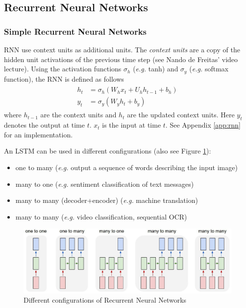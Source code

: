 \documentclass[a4paper,twoside,10pt]{article}
\begin{document}
\subsection{Recurrent Neural Networks}
\subsubsection{Simple Recurrent Neural Networks}
\ac{RNN} use context units as additional units.
The \emph{context units} are a copy of the hidden unit activations of the previous time step (see Nando de Freitas' video lecture\citep{defreitas12}).
Using the activation functions $\sigma_h$ (\emph{e.g.} tanh) and $\sigma_y$ (\emph{e.g.} softmax function), the \ac{RNN} is defined as follows\citep{wiki:rnn,elman_finding_1990,suresh}
\begin{align*}
  \begin{split}
    h_t&=\sigma_h(W_hx_t+U_hh_{t-1}+b_h)\\
    y_t&=\sigma_y(W_yh_t+b_y)
  \end{split}
\end{align*}
where $h_{t-1}$ are the context units and $h_t$ are the updated context units.
Here $y_t$ denotes the output at time $t$. $x_t$ is the input at time $t$.
See Appendix \ref{app:rnn} for an implementation.

An \ac{LSTM} can be used in different configurations\citep{karpathy2016cs231n} (also see Figure \ref{fig:rnnconf}):
\begin{itemize}
  \item one to many (\emph{e.g.} output a sequence of words describing the input image)
  \item many to one (\emph{e.g.} sentiment classification of text messages)
  \item many to many (decoder+encoder) (\emph{e.g.} machine translation)
  \item many to many (\emph{e.g.} video classification, sequential \ac{OCR}\citep{ba2014multiple,gregor2015draw})
\end{itemize}
\begin{figure}[htbp]
  \begin{center}
    \includegraphics[width=.6\textwidth]{rnnconf}
    \caption{Different configurations of Recurrent Neural Networks\citep{karpathy2016cs231n}\label{fig:rnnconf}}
  \end{center}
\end{figure}
\end{document}
